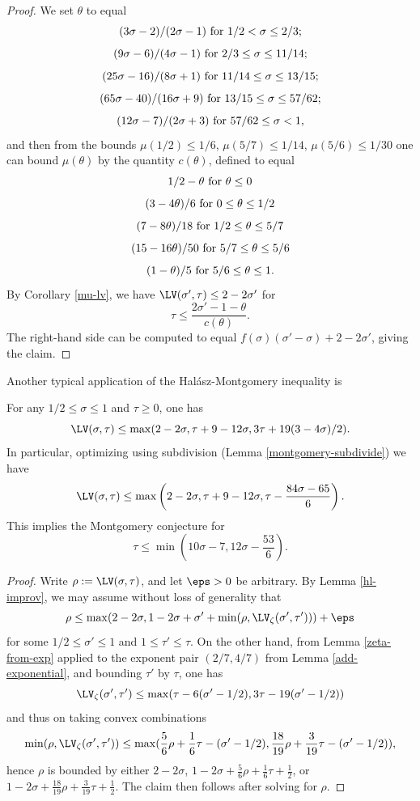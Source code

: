 \begin{proof} We set $\theta$ to equal
$$ (3\sigma-2)/(2\sigma-1) \hbox{ for } 1/2 < \sigma \leq 2/3;$$
$$ (9\sigma-6)/(4\sigma-1) \hbox{ for } 2/3 \leq \sigma \leq 11/14;$$
$$ (25\sigma-16)/(8\sigma+1) \hbox{ for } 11/14 \leq \sigma \leq 13/15;$$
$$ (65\sigma-40)/(16\sigma+9) \hbox{ for } 13/15 \leq \sigma \leq 57/62;$$
$$ (12\sigma-7)/(2\sigma+3) \hbox{ for } 57/62 \leq \sigma < 1,$$
and then from the bounds $\mu(1/2) \leq 1/6$, $\mu(5/7) \leq 1/14$, $\mu(5/6) \leq 1/30$ one can bound $\mu(\theta)$ by the quantity $c(\theta)$, defined to equal
$$ 1/2 - \theta \hbox{ for } \theta \leq 0$$
$$ (3-4\theta)/6 \hbox{ for } 0 \leq \theta \leq 1/2$$
$$ (7-8\theta)/18 \hbox{ for } 1/2 \leq \theta \leq 5/7$$
$$ (15-16\theta)/50 \hbox{ for } 5/7 \leq \theta \leq 5/6$$
$$ (1-\theta)/5 \hbox{ for } 5/6 \leq \theta \leq 1.$$
By Corollary \ref{mu-lv}, we have $\LV(\sigma',\tau) \leq 2-2\sigma'$ for
$$ \tau \leq \frac{2\sigma'-1-\theta}{c(\theta)}.$$
The right-hand side can be computed to equal $f(\sigma)(\sigma'-\sigma) + 2 - 2\sigma'$, giving the claim.
\end{proof}

Another typical application of the Hal\'asz-Montgomery inequality is

\begin{lemma}\label{ivic-lvt}\cite[(11.40)]{ivic}  For any $1/2 \leq \sigma \leq 1$ and $\tau \geq 0$, one has
    $$ \LV(\sigma,\tau) \leq \max( 2-2\sigma, \tau + 9-12\sigma, 3\tau + 19(3-4\sigma)/2).$$
    In particular, optimizing using subdivision (Lemma \ref{montgomery-subdivide}) we have
    $$ \LV(\sigma,\tau) \leq \max\left( 2-2\sigma, \tau + 9-12\sigma, \tau - \frac{84\sigma-65}{6}\right).$$
    This implies the Montgomery conjecture for
    $$ \tau \leq \min\left( 10\sigma-7, 12 \sigma - \frac{53}{6}\right).$$
\end{lemma}

\begin{proof}  Write $\rho := \LV(\sigma,\tau)$, and let $\eps>0$ be arbitrary. By Lemma \ref{hl-improv}, we may assume without loss of generality that
    $$ \rho \leq \max( 2-2\sigma, 1-2\sigma + \sigma' + \min( \rho, \LV_\zeta(\sigma',\tau')) ) + \eps$$
    for some $1/2 \leq \sigma' \leq 1$ and $1 \leq \tau' \leq \tau$.  On the other hand, from Lemma \ref{zeta-from-exp} applied to the exponent pair $(2/7,4/7)$ from Lemma \ref{add-exponential}, and bounding $\tau'$ by $\tau$, one has
    $$ \LV_\zeta(\sigma',\tau') \leq \max( \tau-6(\sigma'-1/2), 3\tau - 19(\sigma'-1/2))$$
    and thus on taking convex combinations
    $$ \min(\rho,\LV_\zeta(\sigma',\tau')) \leq \max( \frac{5}{6}\rho + \frac{1}{6} \tau - (\sigma'-1/2), \frac{18}{19} \rho + \frac{3}{19} \tau - (\sigma'-1/2) ),$$
    hence $\rho$ is bounded by either $2 - 2 \sigma$, $1 - 2\sigma + \frac{5}{6}\rho + \frac{1}{6} \tau + \frac{1}{2}$, or $1-2\sigma + \frac{18}{19} \rho + \frac{3}{19} \tau + \frac{1}{2}$.  The claim then follows after solving for $\rho$.
\end{proof}



